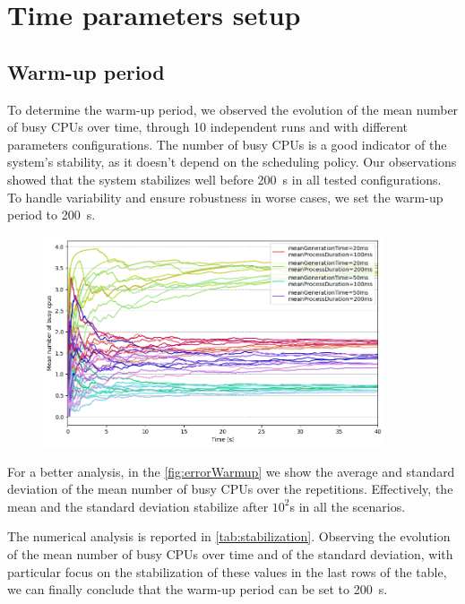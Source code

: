 
\section{Time parameters setup}

\subsection{Warm-up period}

To determine the warm-up period, we observed the evolution of the mean number of busy CPUs over time, through 10 independent runs and with different parameters configurations. The number of busy CPUs is a good indicator of the system's stability, as it doesn't depend on the scheduling policy.
Our observations showed that the system stabilizes well before \SI{200}{\second} in all tested configurations. To handle variability and ensure robustness in worse cases, we set the warm-up period to \SI{200}{\second}.

\begin{figure}[H]
    \captionsetup{type=figure}
    \centering
    \includegraphics[width=0.9\textwidth]{./images/04/lineWarmup.png}
    \label{fig:lineWarmup}
\end{figure}

For a better analysis, in the \autoref{fig:errorWarmup} we show the 
average and standard deviation of the mean number of busy CPUs over the repetitions. 
Effectively, the mean and the standard deviation stabilize after $10^2$s in all
the scenarios.

The numerical analysis is reported in \autoref{tab:stabilization}. Observing the evolution
of the mean number of busy CPUs over time and of the standard deviation, with particular focus
on the stabilization of these values in the last rows of the table, we can finally
conclude that the warm-up period can be set to \SI{200}{\second}.


